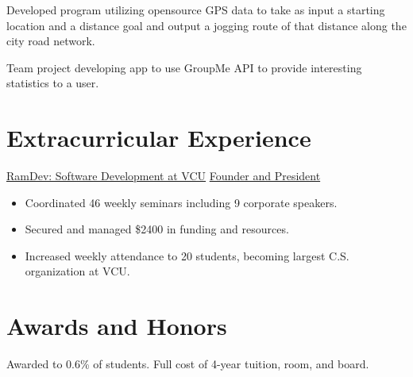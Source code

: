 \documentclass[11pt,letterpaper,serif]{moderncv}
\begin{document}
{
	\begin{adjustwidth}{.25in}{}
		Developed program utilizing opensource GPS data to take as input a starting location and a distance goal and output a jogging route of that distance along the city road network.
	\end{adjustwidth}
}

{
	\begin{adjustwidth}{.25in}{}
		Team project developing app to use GroupMe API to provide interesting statistics to a user.
	\end{adjustwidth}
}


\section{Extracurricular Experience}
{\href{https://vcuramdev.github.io/}{RamDev: Software Development at VCU}}
{\href{https://vcuramdev.github.io/}{Founder and President}}
{}{}
{
	\begin{adjustwidth}{.25in}{}
		\begin{itemize}
			\item Coordinated 46 weekly seminars including 9 corporate speakers.
			\item Secured and managed \$2400 in funding and resources.
			\item Increased weekly attendance to 20 students, becoming largest C.S. organization at VCU.
		\end{itemize}
	\end{adjustwidth}
}


\section{Awards and Honors}
{	
	\begin{adjustwidth}{.25in}{}
		Awarded to 0.6\% of students. Full cost of 4-year tuition, room, and board. \newline
	\end{adjustwidth}
}
\end{document}
